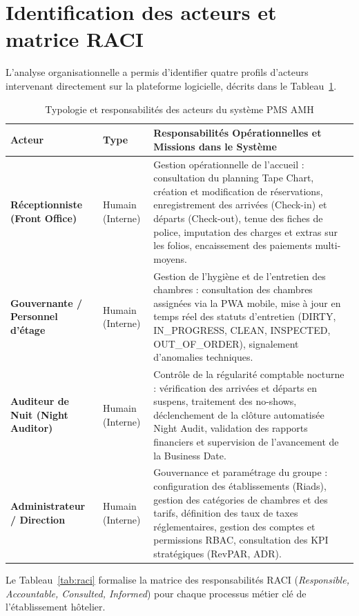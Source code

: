 \documentclass[12pt,a4paper,oneside]{report}
\begin{document}
\section{Identification des acteurs et matrice RACI}

L'analyse organisationnelle a permis d'identifier quatre profils d'acteurs intervenant directement sur la plateforme logicielle, décrits dans le Tableau~\ref{tab:acteurs_detail}.

\begin{table}[H]
\centering
\small
\renewcommand{\arraystretch}{1.3}
\begin{tabularx}{\textwidth}{|p{3.2cm}|p{2.2cm}|X|}
\hline
\textbf{Acteur} & \textbf{Type} & \textbf{Responsabilités Opérationnelles et Missions dans le Système} \\
\hline
\textbf{Réceptionniste (Front Office)} & Humain (Interne) & Gestion opérationnelle de l'accueil : consultation du planning Tape Chart, création et modification de réservations, enregistrement des arrivées (Check-in) et départs (Check-out), tenue des fiches de police, imputation des charges et extras sur les folios, encaissement des paiements multi-moyens. \\
\hline
\textbf{Gouvernante / Personnel d'étage} & Humain (Interne) & Gestion de l'hygiène et de l'entretien des chambres : consultation des chambres assignées via la PWA mobile, mise à jour en temps réel des statuts d'entretien (DIRTY, IN\_PROGRESS, CLEAN, INSPECTED, OUT\_OF\_ORDER), signalement d'anomalies techniques. \\
\hline
\textbf{Auditeur de Nuit (Night Auditor)} & Humain (Interne) & Contrôle de la régularité comptable nocturne : vérification des arrivées et départs en suspens, traitement des no-shows, déclenchement de la clôture automatisée Night Audit, validation des rapports financiers et supervision de l'avancement de la Business Date. \\
\hline
\textbf{Administrateur / Direction} & Humain (Interne) & Gouvernance et paramétrage du groupe : configuration des établissements (Riads), gestion des catégories de chambres et des tarifs, définition des taux de taxes réglementaires, gestion des comptes et permissions RBAC, consultation des KPI stratégiques (RevPAR, ADR). \\
\hline
\end{tabularx}
\caption{Typologie et responsabilités des acteurs du système PMS AMH}
\label{tab:acteurs_detail}
\end{table}

Le Tableau~\ref{tab:raci} formalise la matrice des responsabilités RACI (\textit{Responsible, Accountable, Consulted, Informed}) pour chaque processus métier clé de l'établissement hôtelier.
\end{document}
